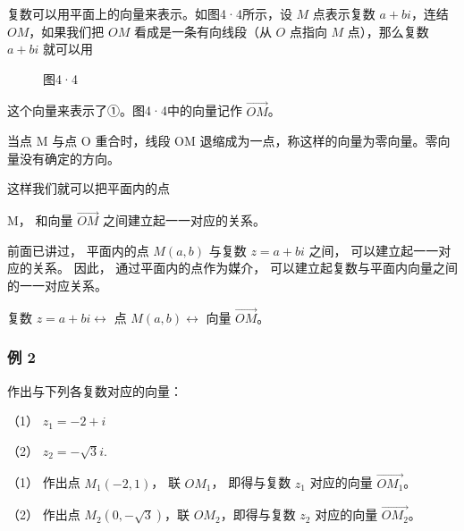 复数可以用平面上的向量来表示。如图4·4所示，设 \(M\) 点表示复数
\(a + bi\)，连结 \(OM\)，如果我们把 \(OM\) 看成是一条有向线段（从 \(O\)
点指向 \(M\) 点），那么复数 \(a + bi\) 就可以用

\begin{figure}
\centering
{}
\caption{图4·4}
\end{figure}
这个向量来表示了①。图4·4中的向量记作 \(\overrightarrow{OM}\)。

当点 M 与点 O 重合时，线段 OM
退缩成为一点，称这样的向量为零向量。零向量没有确定的方向。

这样我们就可以把平面内的点

M， 和向量 \(\overrightarrow{OM}\) 之间建立起一一对应的关系。

前面已讲过， 平面内的点 \(M(a, b)\) 与复数 \(z = a + bi\) 之间，
可以建立起一一对应的关系。 因此， 通过平面内的点作为媒介，
可以建立起复数与平面内向量之间的一一对应关系。

复数 \(z = a + bi \leftrightarrow\) 点 \(M(a, b) \leftrightarrow\) 向量
\(\overrightarrow{OM}\)。

\subsubsection{例 2}

作出与下列各复数对应的向量：

（1） \(z_{1} = -2 + i\)

（2） \(z_{2} = -\sqrt{3} i.\)

 （1） 作出点 \(M_{1}(-2, 1)\)， 联 \(OM_{1}\)，
即得与复数 \(z_{1}\) 对应的向量 \(\overrightarrow{OM_{1}}\)。

（2） 作出点 \(M_{2}(0, -\sqrt{3})\)，联 \(OM_{2}\)，即得与复数
\(z_{2}\) 对应的向量 \(\overrightarrow{OM_{2}}\)。


